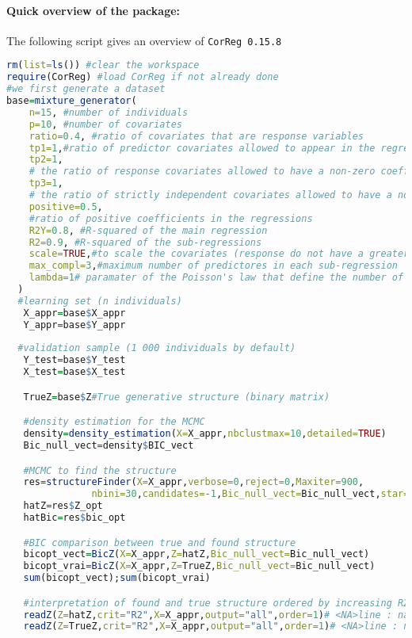 \documentclass[12pt,a4paper]{report}
\begin{document}
\begin{appendices}
\paragraph{Quick overview of the package:} The following script gives an overview of {\tt CorReg 0.15.8}
\begin{lstlisting}[language=R]
rm(list=ls()) #clear the workspace
require(CorReg) #load CorReg if not already done
#we first generate a dataset
base=mixture_generator(
	n=15, #number of individuals
	p=10, #number of covariates
	ratio=0.4, #ratio of covariates that are response variables
	tp1=1,#ratio of predictor covariates allowed to appear in the regression of Y
	tp2=1,
	# the ratio of response covariates allowed to have a non-zero coefficient in the regression of Y
	tp3=1,
	# the ratio of strictly independent covariates allowed to have a non-zero coefficient in the regression of Y
	positive=0.5, 
	#ratio of positive coefficients in the regressions
    R2Y=0.8, #R-squared of the main regression
    R2=0.9, #R-squared of the sub-regressions
    scale=TRUE,#to scale the covariates (response do not have a greater variance or mean)
    max_compl=3,#maximum number of predictores in each sub-regression
    lambda=1# paramater of the Poisson's law that define the number of components in gaussian mixture models
  )
  #learning set (n individuals)
   X_appr=base$X_appr 
   Y_appr=base$Y_appr 
   
  #validation sample (1 000 individuals by default)
   Y_test=base$Y_test
   X_test=base$X_test

   TrueZ=base$Z#True generative structure (binary matrix)

   #density estimation for the MCMC
   density=density_estimation(X=X_appr,nbclustmax=10,detailed=TRUE)
   Bic_null_vect=density$BIC_vect

   #MCMC to find the structure
   res=structureFinder(X=X_appr,verbose=0,reject=0,Maxiter=900,
               nbini=30,candidates=-1,Bic_null_vect=Bic_null_vect,star=TRUE,p1max=15,clean=TRUE)
   hatZ=res$Z_opt
   hatBic=res$bic_opt

   #BIC comparison between true and found structure
   bicopt_vect=BicZ(X=X_appr,Z=hatZ,Bic_null_vect=Bic_null_vect)
   bicopt_vrai=BicZ(X=X_appr,Z=TrueZ,Bic_null_vect=Bic_null_vect)
   sum(bicopt_vect);sum(bicopt_vrai)

   #interpretation of found and true structure ordered by increasing R2
   readZ(Z=hatZ,crit="R2",X=X_appr,output="all",order=1)# <NA>line : name of subregressed covariate
   readZ(Z=TrueZ,crit="R2",X=X_appr,output="all",order=1)# <NA>line : name of subregressed covariate


\end{lstlisting}
\end{appendices}
\end{document}
